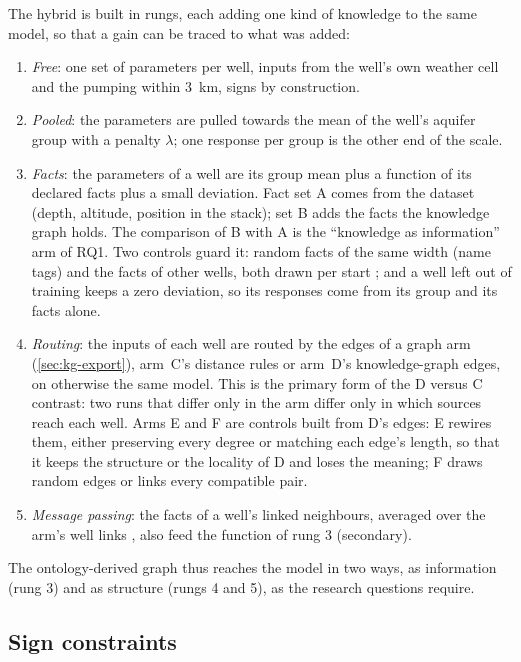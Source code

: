 The hybrid is built in rungs, each adding one kind of knowledge to the same model, so that a gain
can be traced to what was added:
\begin{enumerate}
\item \emph{Free}: one set of parameters per well, inputs from the well's own weather cell and the
  pumping within \SI{3}{km}, signs by construction.
\item \emph{Pooled}: the parameters are pulled towards the mean of the well's aquifer group with a
  penalty $\lambda$; one response per group is the other end of the scale.
\item \emph{Facts}: the parameters of a well are its group mean plus a function of its declared
  facts plus a small deviation. Fact set A comes from the dataset (depth, altitude, position in the
  stack); set B adds the facts the knowledge graph holds. The comparison of B with A is the
  ``knowledge as information'' arm of RQ1. Two controls guard it: random facts of the same width
  (name tags) and the facts of other wells, both drawn per start \citep{Heudorfer2024On}; and a
  well left out of training keeps a zero deviation, so its responses come from its group and its
  facts alone.
\item \emph{Routing}: the inputs of each well are routed by the edges of a graph arm
  (\cref{sec:kg-export}), arm~C's distance rules or arm~D's knowledge-graph edges, on otherwise the
  same model. This is the primary form of the D versus C contrast: two runs that differ only in the
  arm differ only in which sources reach each well. Arms E and F are controls built from D's edges:
  E rewires them, either preserving every degree or matching each edge's length, so that it keeps
  the structure or the locality of D and loses the meaning; F draws random edges or links every
  compatible pair.
\item \emph{Message passing}: the facts of a well's linked neighbours, averaged over the arm's
  well links \citep{Hamilton2018Inductive}, also feed the function of rung 3 (secondary).
\end{enumerate}
The ontology-derived graph thus reaches the model in two ways, as information (rung 3) and as
structure (rungs 4 and 5), as the research questions require. %

\subsection{Sign constraints}\label{sec:signs}

